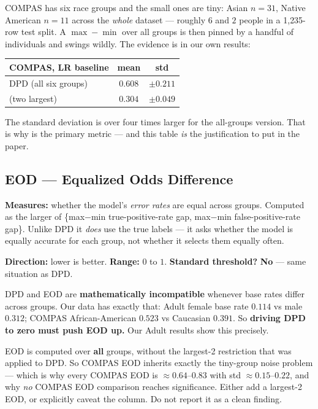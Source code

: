 \begin{example}
COMPAS has six race groups and the small ones are tiny: Asian $n=31$, Native
American $n=11$ across the \emph{whole} dataset --- roughly $6$ and $2$ people
in a 1{,}235-row test split. A $\max-\min$ over all groups is then pinned by a
handful of individuals and swings wildly. The evidence is in our own results:
\begin{center}
\begin{tabular}{@{}lcc@{}}
\toprule
COMPAS, LR baseline & mean & std \\
\midrule
DPD (all six groups)  & $0.608$ & $\pm 0.211$ \\
\dpdtwo{} (two largest) & $0.304$ & $\pm 0.049$ \\
\bottomrule
\end{tabular}
\end{center}
The standard deviation is over four times larger for the all-groups version.
That is why \dpdtwo{} is the primary metric --- and this table \emph{is} the
justification to put in the paper.
\end{example}

\subsection{EOD --- Equalized Odds Difference}

\textbf{Measures:} whether the model's \emph{error rates} are equal across
groups. Computed as the larger of \{max$-$min true-positive-rate gap,
max$-$min false-positive-rate gap\}. Unlike DPD it \emph{does} use the true
labels --- it asks whether the model is equally accurate for each group, not
whether it selects them equally often.

\textbf{Direction:} lower is better. \textbf{Range:} $0$ to $1$.
\textbf{Standard threshold?} \textbf{No} --- same situation as DPD.

\begin{keybox}
DPD and EOD are \textbf{mathematically incompatible} whenever base rates differ
across groups. Our data has exactly that: Adult female base rate $0.114$ vs
male $0.312$; COMPAS African-American $0.523$ vs Caucasian $0.391$. So
\textbf{driving DPD to zero must push EOD up.} Our Adult results show this
precisely.
\end{keybox}

\begin{warnbox}
EOD is computed over \textbf{all} groups, without the largest-2 restriction
that was applied to DPD. So COMPAS EOD inherits exactly the tiny-group noise
problem --- which is why every COMPAS EOD is $\approx 0.64$--$0.83$ with std
$\approx 0.15$--$0.22$, and why \emph{no} COMPAS EOD comparison reaches
significance. Either add a largest-2 EOD, or explicitly caveat the column. Do
not report it as a clean finding.
\end{warnbox}

